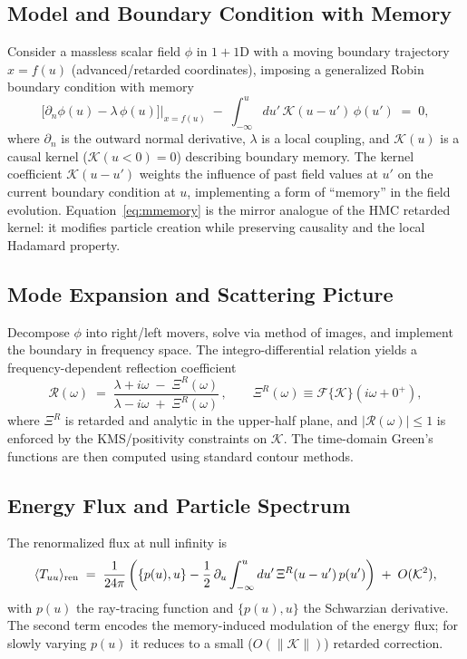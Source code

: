 \documentclass[aps,prd,preprint,onecolumn,superscriptaddress,nofootinbib,longbibliography,floatfix,11pt,showpacs,showkeys]{revtex4-2}
\newcommand{\HMC}{\textsc{HMC}\xspace}
\theoremstyle{plain}
\theoremstyle{definition}
\theoremstyle{remark}
\begin{document}
\subsection{Model and Boundary Condition with Memory}
Consider a massless scalar field $\phi$ in $1+1$D with a moving boundary trajectory $x=f(u)$ (advanced/retarded coordinates), imposing a generalized Robin boundary condition with memory
\begin{equation}
\left.\Big[\partial_n \phi(u)-\lambda\,\phi(u)\Big]\right|_{x=f(u)}\;-\;\int_{-\infty}^u du'\,\mathcal{K}(u-u')\,\phi(u')\;=\;0,
\label{eq:mmemory}
\end{equation}
where $\partial_n$ is the outward normal derivative, $\lambda$ is a local coupling, and $\mathcal{K}(u)$ is a causal kernel ($\mathcal{K}(u<0)=0$) describing boundary memory. The kernel coefficient $\mathcal{K}(u-u')$ weights the influence of past field values at $u'$ on the current boundary condition at $u$, implementing a form of ``memory'' in the field evolution. Equation~\eqref{eq:mmemory} is the mirror analogue of the \HMC{} retarded kernel: it modifies particle creation while preserving causality and the local Hadamard property.

\subsection{Mode Expansion and Scattering Picture}
Decompose $\phi$ into right/left movers, solve via method of images, and implement the boundary in frequency space. The integro-differential relation yields a frequency-dependent reflection coefficient
\begin{equation}
\mathcal{R}(\omega)\;=\;\frac{\lambda+i\omega\;-\;\Xi^R(\omega)}{\lambda-i\omega\;+\;\Xi^R(\omega)}\,,
\qquad \Xi^R(\omega)\equiv \mathcal{F}\{\mathcal{K}\}(i\omega+0^+),
\end{equation}
where $\Xi^R$ is retarded and analytic in the upper-half plane, and $|\mathcal{R}(\omega)|\le 1$ is enforced by the KMS/positivity constraints on $\mathcal{K}$. The time-domain Green's functions are then computed using standard contour methods.

\subsection{Energy Flux and Particle Spectrum}
The renormalized flux at null infinity is
\begin{equation}
\langle T_{uu}\rangle_{\rm ren}\;=\;\frac{1}{24\pi}\left(\{p(u),u\}-\frac{1}{2}\,\partial_u \int_{-\infty}^u du'\,\Xi^R(u-u')\,p(u')\right)\;+\;O(\mathcal{K}^2),
\end{equation}
with $p(u)$ the ray-tracing function and $\{p(u),u\}$ the Schwarzian derivative. The second term encodes the memory-induced modulation of the energy flux; for slowly varying $p(u)$ it reduces to a small ($O(\|\mathcal{K}\|)$) retarded correction.
\end{document}
